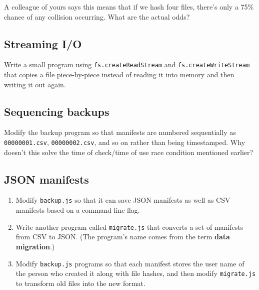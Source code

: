 \documentclass[krantzl]{krantz}
\newcommand{\glossref}[1]{\textbf{#1}}
\begin{document}
\vspace{\baselineskip}


A colleague of yours says this means that if we hash four files,
there’s only a 75\% chance of any collision occurring.
What are the actual odds?

\subsection*{Streaming I/O}


Write a small program using \texttt{fs.createReadStream} and \texttt{fs.createWriteStream}
that copies a file piece-by-piece
instead of reading it into memory and then writing it out again.

\subsection*{Sequencing backups}


Modify the backup program so that manifests are numbered sequentially
as \texttt{00000001.csv}, \texttt{00000002.csv}, and so on
rather than being timestamped.
Why doesn’t this solve the time of check/time of use race condition mentioned earlier?

\subsection*{JSON manifests}

\begin{enumerate}

\item 

Modify \texttt{backup.js} so that it can save JSON manifests as well as CSV manifests
    based on a command-line flag.



\item 

Write another program called \texttt{migrate.js} that converts a set of manifests
    from CSV to JSON.
    (The program’s name comes from the term \glossref{data migration}.)



\item 

Modify \texttt{backup.js} programs so that each manifest stores the user name of the person who created it
    along with file hashes,
    and then modify \texttt{migrate.js} to transform old files into the new format.



\end{enumerate}
\end{document}
